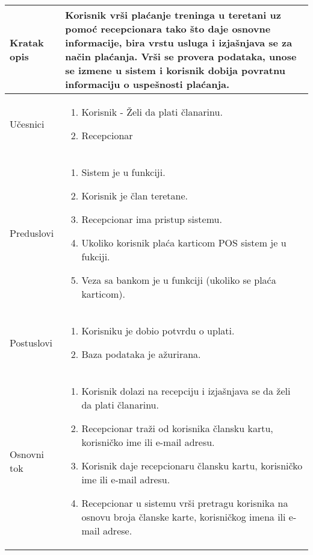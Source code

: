 \documentclass[../main.tex]{subfiles}
\begin{document}
\begin{longtable}{| p{} | p{} |} 

\hline
    Kratak opis &  Korisnik vrši plaćanje treninga u teretani uz pomoć recepcionara tako što daje osnovne informacije, bira vrstu usluga i izjašnjava se za način plaćanja. Vrši se provera podataka, unose se izmene u sistem i korisnik dobija povratnu informaciju o uspešnosti plaćanja.\\ 
\hline    
    Učesnici & 
    	\begin{enumerate}
        \item Korisnik - Želi da plati članarinu. 
        \item Recepcionar
     \end{enumerate}\\
\hline
   Preduslovi & \begin{enumerate}
       \item Sistem je u funkciji.
       \item Korisnik je član teretane.
       \item Recepcionar ima pristup sistemu.
       \item Ukoliko korisnik plaća karticom POS sistem je u fukciji.
       \item Veza sa bankom je u funkciji (ukoliko se plaća karticom).	
   \end{enumerate}\\
\hline  
    Postuslovi & \begin{enumerate}
        \item Korisniku je dobio potvrdu o uplati.
        \item Baza podataka je ažurirana.
    \end{enumerate}\\
\hline
    Osnovni tok & \begin{enumerate}
        \item Korisnik dolazi na recepciju i izjašnjava se da želi da plati članarinu.
        \item Recepcionar traži od korisnika člansku kartu, korisničko ime ili e-mail adresu.	
        \item Korisnik daje recepcionaru člansku kartu, korisničko ime ili e-mail adresu.
        \item Recepcionar u sistemu vrši pretragu korisnika na osnovu broja članske karte, korisničkog imena ili e-mail adrese.

\end{enumerate}
\end{longtable}
\end{document}
